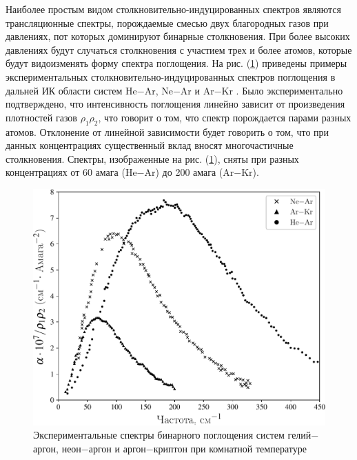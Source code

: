     Наиболее простым видом столкновительно-индуцированных спектров являются трансляционные спектры, порождаемые смесью двух благородных газов при давлениях, пот которых доминируют бинарные столкновения. При более высоких давлениях будут случаться столкновения с участием трех и более атомов, которые будут видоизменять форму спектра поглощения. На рис. (\ref{fig:pic-two-atom-experiment}) приведены примеры экспериментальных столкновительно-индуцированных спектров поглощения в дальней ИК области систем He$-$Ar, Ne$-$Ar и Ar$-$Kr \cite{frommhold}. Было экспериментально подтверждено, что интенсивность поглощения линейно зависит от произведения плотностей газов $\rho_1 \rho_2$, что говорит о том, что спектр порождается парами разных атомов. Отклонение от линейной зависимости будет говорить о том, что при данных концентрациях существенный вклад вносят многочастичные столкновения. Спектры, изображенные на рис. (\ref{fig:pic-two-atom-experiment}), сняты при разных концентрациях от 60 амага (He$-$Ar) до 200 амага (Ar$-$Kr).  

\begin{figure}[H]
    \centering
    \includegraphics[width=0.7\linewidth]{./pictures/twoatom_experiment/experiment_diatom_spectra-crop.pdf}
    \caption{Экспериментальные спектры бинарного поглощения систем гелий$-$аргон, неон$-$аргон и аргон$-$криптон при комнатной температуре \cite{frommhold}}
    \label{fig:pic-two-atom-experiment}
\end{figure}

